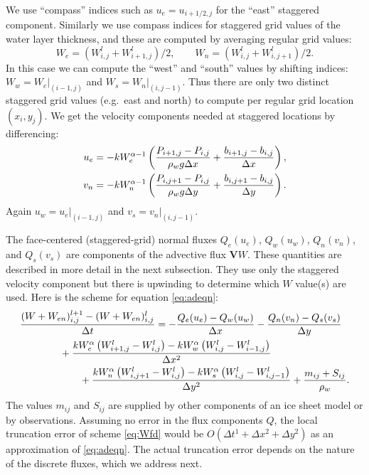 \documentclass[11pt,final]{amsart}
\newcommand\bV{\mathbf{V}}
\newcommand{\Wlij}{W^l_{i,j}}
\begin{document}
We use ``compass'' indices such as $u_e = u_{i+1/2,j}$ for the ``east'' staggered component.  Similarly we use compass indices for staggered grid values of the water layer thickness, and these are computed by averaging regular grid values:
\begin{equation}
W_e = (W_{i,j}^l + W_{i+1,j}^l)/2, \qquad W_n = (W_{i,j}^l + W_{i,j+1}^l)/2. \label{eq:stagW}
\end{equation}
In this case we can compute the ``west'' and ``south'' values by shifting indices: $W_w = W_e\big|_{(i-1,j)}$ and $W_s = W_n\big|_{(i,j-1)}$.  Thus there are only two distinct staggered grid values (e.g.~east and north) to compute per regular grid location $(x_i,y_j)$.  We get the velocity components needed at staggered locations by differencing:
\begin{align}
u_e &= - k W_e^{\alpha-1} \left(\frac{P_{i+1,j}-P_{i,j}}{\rho_w g \Delta x} + \frac{b_{i+1,j}-b_{i,j}}{\Delta x}\right), \label{eq:velocitycomp} \\
v_n  &= - k W_n^{\alpha-1} \left(\frac{P_{i,j+1}-P_{i,j}}{\rho_w g \Delta y} + \frac{b_{i,j+1}-b_{i,j}}{\Delta y}\right). \notag
\end{align}
Again $u_w = u_e\big|_{(i-1,j)}$ and $v_s = v_n\big|_{(i,j-1)}$.

The face-centered (staggered-grid) normal fluxes $Q_e(u_e)$, $Q_w(u_w)$, $Q_n(v_n)$, and $Q_s(v_s)$ are components of the advective flux $\bV W$.  These quantities are described in more detail in the next subsection.  They use only the staggered velocity component but there is upwinding to determine which $W$ value(s) are used.  Here is the scheme for equation \eqref{eq:adeqn}:
\begin{align}
 &\frac{(W+W_{en})_{i,j}^{l+1} - (W+W_{en})_{i,j}^l}{\Delta t} = - \frac{Q_e(u_e) - Q_w(u_w)}{\Delta x} - \frac{Q_n(v_n) - Q_s(v_s)}{\Delta y} \label{eq:Wfd} \\
      &\qquad\qquad + \frac{k W_e^\alpha \left(W_{i+1,j}^l - \Wlij\right) - k W_w^\alpha \left(\Wlij - W_{i-1,j}^l\right)}{\Delta x^2}  \notag \\
      &\qquad\qquad\qquad + \frac{k W_n^\alpha \left(W_{i,j+1}^l - \Wlij\right) - k W_s^\alpha \left(\Wlij - W_{i,j-1}^l\right)}{\Delta y^2}  + \frac{m_{ij}+S_{ij}}{\rho_w}. \notag
\end{align}
The values $m_{ij}$ and $S_{ij}$ are supplied by other components of an ice sheet model or by observations.  Assuming no error in the flux components $Q$, the local truncation error \citep{MortonMayers} of scheme \eqref{eq:Wfd} would be $O(\Delta t^1 + \Delta x^2 + \Delta y^2)$ as an approximation of \eqref{eq:adeqn}.  The actual truncation error depends on the nature of the discrete fluxes, which we address next.
\end{document}
